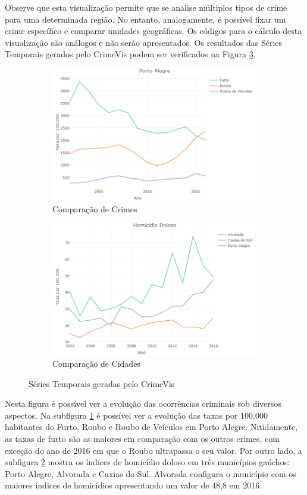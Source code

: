 \documentclass[12pt,openright,oneside,a4paper,english,french,spanish]{abntex2}
\numberwithin{table}{section} %
\numberwithin{figure}{section} %
\begin{document}
Observe que esta visualização permite que se analise múltiplos tipos de crime para uma determinada região. No entanto, analogamente, é possível fixar um crime específico e comparar unidades geográficas. Os códigos para o cálculo desta visualização são análogos e não serão apresentados. Os resultados das Séries Temporais gerados pelo CrimeVis podem ser verificados na Figura \ref{fig:ts_crimevis}.

\begin{figure}[H]
\begin{subfigure}{.55\textwidth}
  \centering
  \includegraphics[width=.85\linewidth]{compara_crimes.png}
  \caption{Comparação de Crimes}
  \label{fig:comp_crime}
\end{subfigure}%
\begin{subfigure}{.55\textwidth}
  \centering
  \includegraphics[width=.85\linewidth]{compara_cidades.png}
  \caption{Comparação de Cidades}
  \label{fig:comp_cidade}
\end{subfigure}
\caption{Séries Temporais geradas pelo CrimeVis}
\label{fig:ts_crimevis}
\end{figure}

Nesta figura é possível ver a evolução das ocorrências criminais sob diversos aspectos. Na subfigura \ref{fig:comp_crime} é possível ver a evolução das taxas por 100.000 habitantes do Furto, Roubo e Roubo de Veículos em Porto Alegre. Nitidamente, as taxas de furto são as maiores em comparação com os outros crimes, com exceção do ano de 2016 em que o Roubo ultrapassa o seu valor. Por outro lado, a subfigura \ref{fig:comp_cidade} mostra os índices de homicídio doloso em três municípios gaúchos: Porto Alegre, Alvorada e Caxias do Sul. Alvorada configura o município com os maiores índices de homicídios apresentando um valor de 48,8 em 2016.
\end{document}
